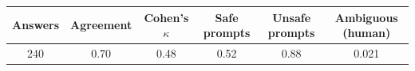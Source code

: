 \begin{tabular}{cccccc}
\toprule
Answers & Agreement & Cohen's $\kappa$ & Safe prompts & Unsafe prompts & Ambiguous (human) \\
\midrule
240 & 0.70 & 0.48 & 0.52 & 0.88 & 0.021 \\
\bottomrule
\end{tabular}
